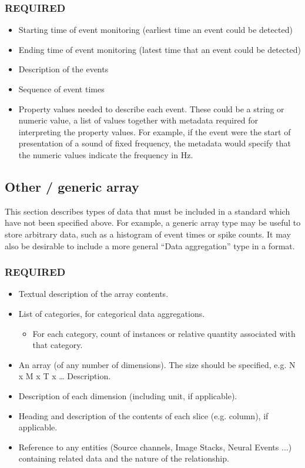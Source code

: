 \documentclass[letterpaper, 10 pt, conference]{ieeeconf}  \IEEEoverridecommandlockouts                              \overrideIEEEmargins
\begin{document}
\subsubsection*{REQUIRED}
\begin{itemize}
\item Starting time of event monitoring (earliest time an event could be detected)
\item Ending time of event monitoring (latest time that an event could be detected)
\item Description of the events
\item Sequence of event times
\item Property values needed to describe each event.  These could be a string or numeric value, a list of values together with metadata required for interpreting the property values.  For example, if the event were the start of presentation of a sound of fixed frequency, the metadata would specify that the numeric values indicate the frequency in Hz.
\end{itemize}

\subsection{Other / generic array}
This section describes types of data that must be included in a standard which have not been specified above.  For example, a generic array type may be useful to store arbitrary data, such as a histogram of event times or spike counts.  It may also be desirable to include a more general “Data aggregation” type in a format. 
\smallskip
\subsubsection*{REQUIRED}
\begin{itemize}
\item Textual description of the array contents.
\item List of categories, for categorical data aggregations.
 \begin{itemize}
 \item For each category, count of instances or relative quantity associated with that category.
 \end{itemize}
\item An array (of any number of dimensions). The size should be specified, e.g. N x M x T x …
Description.
\item Description of each dimension (including unit, if applicable).
\item Heading and description of the contents of each slice (e.g. column), if applicable.
\item Reference to any entities (Source channels, Image Stacks, Neural Events ...) containing related data and the nature of the relationship.
\end{itemize}
\end{document}
